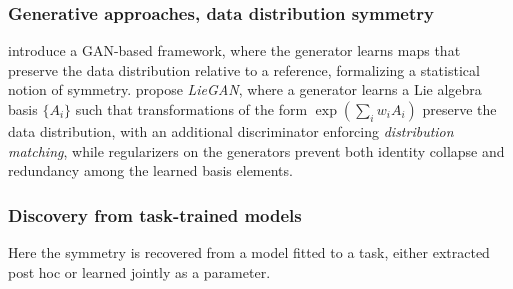 \documentclass[mathematics,review,submit,moreauthors]{Definitions/mdpi}
\begin{document}
\subsubsection{Generative approaches, data distribution symmetry}
\citet{desai2022prd} introduce a GAN-based framework, where the generator learns maps that preserve the data distribution relative to a reference, formalizing a statistical notion of symmetry.
\citet{yang2023p4icml} propose \textit{LieGAN}, where a generator learns a Lie algebra basis $\{A_i\}$ such that transformations of the form $\exp(\sum_i w_i A_i)$ preserve the data distribution, with an additional discriminator enforcing \textit{distribution matching}, while regularizers on the generators prevent both identity collapse and redundancy among the learned basis elements.


\subsubsection{Discovery from task-trained models}
Here the symmetry is recovered from a model fitted to a task, either extracted post hoc or learned jointly as a parameter.
\end{document}

